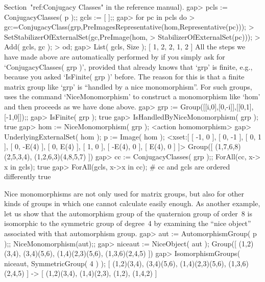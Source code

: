 Section~"ref:Conjugacy Classes" in the reference manual).
\beginexample
gap> pcls := ConjugacyClasses( p );; gcls := [  ];;
gap> for pc  in pcls  do
>      gc:=ConjugacyClass(grp,PreImagesRepresentative(hom,Representative(pc)));
>      SetStabilizerOfExternalSet(gc,PreImage(hom,
>                                 StabilizerOfExternalSet(pc)));
>      Add( gcls, gc );
>    od;
gap> List( gcls, Size );
[ 1, 2, 2, 1, 2 ]
\endexample
All the steps we have made above are automatically performed by {\GAP} if
you  simply ask for `ConjugacyClasses(   grp   )', provided that   {\GAP}
already knows  that `grp' is finite, e.g.,  because  you asked `IsFinite(
grp  )' before. The reason  for this is that  a  finite matrix group like
`grp' is ``handled by a nice monomorphism''. For such groups, {\GAP} uses
the command `NiceMonomorphism' to construct a monomorphism like `hom' and
then proceeds as we have done above.
\beginexample
gap> grp := Group([[i,0],[0,-i]],[[0,1],[-1,0]]);;
gap> IsFinite( grp );
true
gap> IsHandledByNiceMonomorphism( grp );
true
gap> hom := NiceMonomorphism( grp );
<action homomorphism>
gap> UnderlyingExternalSet( hom ); p := Image( hom );
<xset:[ [ -1, 0 ], [ 0, -1 ], [ 0, 1 ], [ 0, -E(4) ], [ 0, E(4) ], [ 1, 0 ], 
  [ -E(4), 0 ], [ E(4), 0 ] ]>
Group([ (1,7,6,8)(2,5,3,4), (1,2,6,3)(4,8,5,7) ])
gap> cc := ConjugacyClasses( grp );; ForAll(cc, x-> x in gcls); 
true
gap> ForAll(gcls, x->x in cc); # cc and gcls are ordered differently
true
\endexample

%

Nice monomorphisms are not only used for matrix groups, but also for
other kinds of groups in which one cannot calculate easily enough. As
another example, let us show that the automorphism group of the
quaternion group of order~8 is isomorphic to the symmetric group of
degree~4  by examining the ``nice object'' associated with that
automorphism group.
\beginexample
gap> aut := AutomorphismGroup( p );; NiceMonomorphism(aut);;
gap> niceaut := NiceObject( aut );
Group([ (1,2)(3,4), (3,4)(5,6), (1,4)(2,3)(5,6), (1,3,6)(2,4,5) ])
gap> IsomorphismGroups( niceaut, SymmetricGroup( 4 ) );
[ (1,2)(3,4), (3,4)(5,6), (1,4)(2,3)(5,6), (1,3,6)(2,4,5) ] -> 
[ (1,2)(3,4), (1,4)(2,3), (1,2), (1,4,2) ]
\endexample

